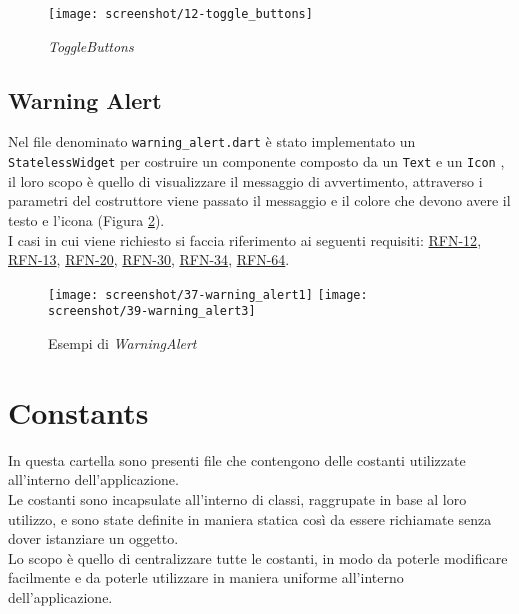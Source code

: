 \begin{figure}[!h] 
    \centering 
    \texttt{[image: screenshot/12-toggle\_buttons]} 
    \caption{\emph{ToggleButtons}}
    \label{fig:toggle-button}
\end{figure}

\clearpage

\subsection{Warning Alert}
\label{subsec:warning-alert}

Nel file denominato \lstinline{warning_alert.dart} è stato implementato un \lstinline{StatelessWidget} per costruire un componente composto da un \lstinline{Text} \cite{site:text} e un \lstinline{Icon} \cite{site:icon}, il loro scopo è quello di visualizzare il messaggio di avvertimento, attraverso i parametri del costruttore viene passato il messaggio e il colore che devono avere il testo e l'icona (Figura \ref{fig:warning-alert}).\\
I casi in cui viene richiesto si faccia riferimento ai seguenti requisiti: \hyperref[RFN-12]{RFN-12}, \hyperref[RFN-13]{RFN-13}, \hyperref[RFN-20]{RFN-20}, \hyperref[RFN-30]{RFN-30}, \hyperref[RFN-34]{RFN-34}, \hyperref[RFN-64]{RFN-64}.

\begin{figure}[!h] 
    \centering 
    \texttt{[image: screenshot/37-warning\_alert1]}
    \hfill
    \texttt{[image: screenshot/39-warning\_alert3]} 
    \caption{Esempi di \emph{WarningAlert}}
    \label{fig:warning-alert}
\end{figure}

\section{Constants}
\label{sec:constants}

In questa cartella sono presenti file che contengono delle costanti utilizzate all'interno dell'applicazione.\\
Le costanti sono incapsulate all'interno di classi, raggrupate in base al loro utilizzo, e sono state definite in maniera statica così da essere richiamate senza dover istanziare un oggetto.\\
Lo scopo è quello di centralizzare tutte le costanti, in modo da poterle modificare facilmente e da poterle utilizzare in maniera uniforme all'interno dell'applicazione.

